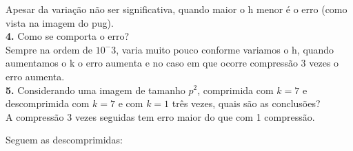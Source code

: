 \documentclass[12pt,letterpaper]{article}
\begin{document}
	Apesar da variação não ser significativa, quando maior o h menor é o erro (como vista na imagem do pug).\\
	
	\textbf{4.} Como se comporta o erro?\\
	
	Sempre na ordem de $10^-3$, varia muito pouco conforme variamos o h, quando aumentamos o k o erro aumenta e no caso em que ocorre compressão 3 vezes o erro aumenta.\\
	
	\textbf{5.} Considerando uma imagem de tamanho $p^2$, comprimida com $k = 7$ e descomprimida com $k = 7$ e com $k = 1$ três vezes, quais são as conclusões?\\
	A compressão 3 vezes seguidas tem erro maior do que com 1 compressão.
	
	
	Seguem as descomprimidas:
	
	\begin{figure}[h]
	\end{figure}
	
	\begin{figure}[h]
	\end{figure}
	
	\begin{figure}[h]
	\end{figure}
	
	\begin{figure}[h]
	\end{figure}
	
\end{document}
